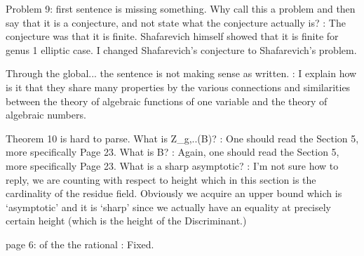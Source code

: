 Problem 9: first sentence is missing something.
Why call this a problem and then say that it is a conjecture, and not state what the conjecture actually is? : The conjecture was that it is finite. Shafarevich himself showed that it is finite for genus 1 elliptic case. I changed Shafarevich's conjecture to Shafarevich's problem.



Through the global... the sentence is not making sense as written. : I explain how is it that they share many properties by the various connections and similarities between the theory of algebraic functions of one variable and the theory of algebraic numbers.



Theorem 10 is hard to parse. 
What is Z_{g,..}(B)? : One should read the Section 5, more specifically Page 23.
What is B? : Again, one should read the Section 5, more specifically Page 23.
What is a sharp asymptotic? : I'm not sure how to reply, we are counting with respect to height which in this section is the cardinality of the residue field. Obviously we acquire an upper bound which is `asymptotic' and it is `sharp' since we actually have an equality at precisely certain height (which is the height of the Discriminant.)



page 6: of the the rational : Fixed.